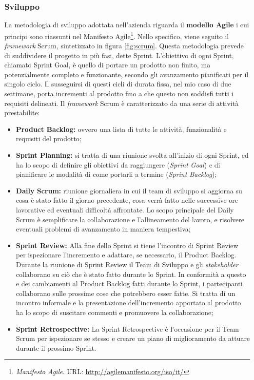 \subsubsection*{Sviluppo}
La metodologia di sviluppo adottata nell'azienda riguarda il \textbf{modello Agile} i cui principi sono riassunti nel Manifesto Agile\footnote{\textit{Manifesto Agile.} URL: \href{http://agilemanifesto.org/iso/it/}{http://agilemanifesto.org/iso/it/}}. 
Nello specifico, viene seguito il \textit{framework} Scrum, sintetizzato in figura \ref{fig:scrum}.
Questa metodologia prevede di suddividere il progetto in più fasi, dette Sprint. L'obiettivo di ogni Sprint, chiamato Sprint Goal, è quello di portare un prodotto non finito, ma potenzialmente completo e funzionante, secondo gli avanzamento pianificati per il singolo ciclo. Il susseguirsi di questi cicli di durata fissa, nel mio caso di due settimane, porta incrementi al prodotto fino a che questo non soddisfi tutti i requisiti delineati.
Il \textit{framework} Scrum è caratterizzato da una serie di attività prestabilite:
\begin{itemize}
\item \textbf{Product Backlog:} ovvero una lista di tutte le attività, funzionalità e requisiti del prodotto;
\item \textbf{Sprint Planning:} si tratta di una riunione svolta all'inizio di ogni Sprint, ed ha lo scopo di definire gli obiettivi da raggiungere (\textit{Sprint Goal}) e di pianificare le modalità di come portarli a termine (\textit{Sprint Backlog});
\item \textbf{Daily Scrum:} riunione giornaliera in cui il team di sviluppo si aggiorna su cosa è stato fatto il giorno precedente, cosa verrà fatto nelle successive ore lavorative ed eventuali difficoltà affrontate. Lo scopo principale del Daily Scrum è semplificare la collaborazione e l'allineamento del lavoro, e risolvere eventuali problemi di avanzamento in maniera tempestiva;
\item \textbf{Sprint Review:} Alla fine dello Sprint si tiene l'incontro di Sprint Review per ispezionare l'incremento e adattare, se necessario, il Product Backlog. Durante la riunione di Sprint Review il Team di Sviluppo e gli \textit{stakeholder} collaborano su ciò che è stato fatto durante lo Sprint. In conformità a questo e dei cambiamenti al Product Backlog fatti durante lo Sprint, i partecipanti collaborano sulle prossime cose che potrebbero esser fatte. Si tratta di un incontro informale e la presentazione dell'incremento apportato al prodotto ha lo scopo di suscitare commenti e promuovere la collaborazione;
\item \textbf{Sprint Retrospective:} La Sprint Retrospective è l'occasione per il Team Scrum per ispezionare se stesso e creare un piano di miglioramento da attuare durante il prossimo Sprint.
\end{itemize}
